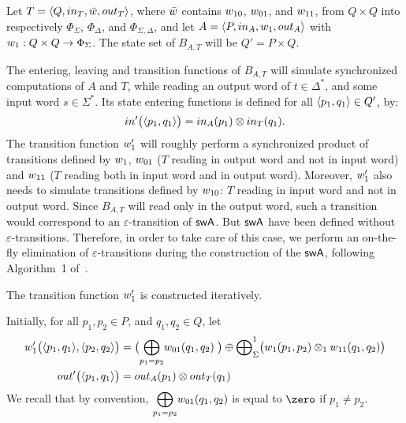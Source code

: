 %
%
Let $T = \< Q, \init_T, \bar{\wei}, \final_T >$,
where $\bar{\wei}$ contains $\wei_{10}$, $\wei_{01}$, and $\wei_{11}$,
from $Q \times Q$ into respectively
$\Phi_{\Sigma}$, $\Phi_{\Delta}$, and $\Phi_{\Sigma, \Delta}$,
and let $A = \< P, \init_A, \wei_1, \final_A >$
with $\wei_1: Q \times Q \to \Phi_{\Sigma}$.
The state set of $B_{A, T}$ will be $Q' = P \times Q$.

The entering, leaving and transition functions of $B_{A, T}$ will
simulate synchronized computations of $A$ and $T$,
while reading an output word of $t \in \Delta^*$, 
and some input word $s \in \Sigma^*$.
%
Its state entering functions is defined
for all $\<p_1, q_1> \in Q'$, %
by:
%
\begin{equation} \label{eq:initprime}
\init'\bigl(\< p_1, q_1>\bigr) = \init_A(p_1) \otimes \init_T(q_1).
\end{equation}
%
The transition function $\wei'_1$ will roughly perform
a synchronized product of transitions defined by $\wei_1$,
$\wei_{01}$ ($T$ reading in output word and not in input word)
and $\wei_{11}$ ($T$ reading both in input word and in output word).
%
Moreover, $\wei'_1$ also needs to simulate transitions
defined by $\wei_{10}$: $T$ reading in input word and not in output word.
Since $B_{A, T}$  will read only in the output word, 
such a transition would correspond
to an $\varepsilon$-transition of $\textsf{swA}$.
But $\textsf{swA}$ have been defined without $\varepsilon$-transitions.
Therefore, in order to take care of this case, we perform an on-the-fly
elimination of $\varepsilon$-transitions during the construction of the $\textsf{swA}$,
following Algorithm~1 of~\cite{LombardySakarovitch12ciaa}.
%


\noindent
The transition function $\wei'_1$ is constructed iteratively.

\noindent
Initially, for all $p_1, p_2 \in P$, and $q_1, q_2 \in Q$, let
%
\begin{align}
\wei'_1\bigl( \< p_1, q_1>, \< p_2, q_2>\bigr) & = 
\bigl({\displaystyle\bigoplus_{p_1 = p_2}} \wei_{01}(q_1, q_2)\;\bigr)
\oplus
{\bigoplus}_\Sigma^1 \bigl(\wei_1(p_1, p_2) \otimes_1 \wei_{11}(q_1, q_2)\bigr)
\label{eq:init-wei}\\
%
\final'\bigl(\<p_1, q_1>\bigr) & =  \final_A(p_1) \otimes \final_T(q_1)
\label{eq:init-final}
\end{align}
We recall that by convention, 
${\displaystyle\bigoplus_{p_1 = p_2}} \wei_{01}(q_1, q_2)$
is equal to $\zero$ if $p_1 \neq p_2$.


